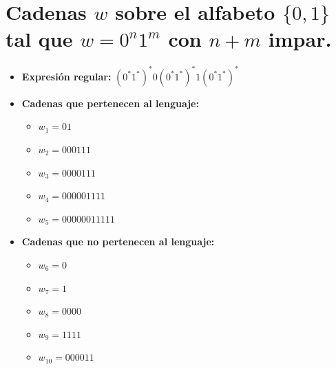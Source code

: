 \documentclass[11pt]{report}
\begin{document}
\section{Cadenas $w$ sobre el alfabeto \texorpdfstring{$\{0, 1\}$}{\{0, 1\}} tal que $w = 0^n1^m$ con $n + m$ impar.}
\begin{itemize}
  \item \textbf{Expresión regular:} $(0^*1^*)^*0(0^*1^*)^*1(0^*1^*)^*$
    \begin{figure}[H]
      \centering
    \end{figure}
  \item \textbf{Cadenas que pertenecen al lenguaje: }
    \begin{itemize}
      \item $w_1 = 01$
      \item $w_2 = 000111$
      \item $w_3 = 0000111$
      \item $w_4 = 000001111$
      \item $w_5 = 00000011111$
    \end{itemize}
  \item \textbf{Cadenas que no pertenecen al lenguaje: }
    \begin{itemize}
      \item $w_6 = 0$
      \item $w_7 = 1$
      \item $w_8 = 0000$
      \item $w_9 = 1111$
      \item $w_{10} = 000011$
    \end{itemize}
\end{itemize}

\newpage
\end{document}
